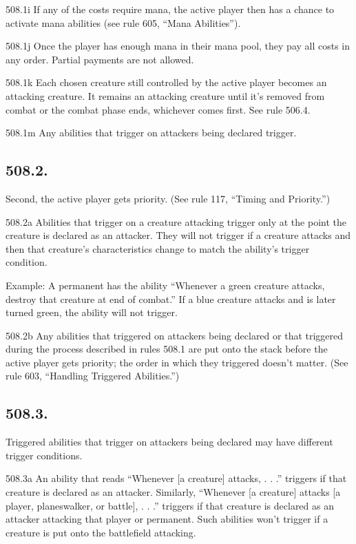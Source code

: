 508.1i If any of the costs require mana, the active player then has a chance to activate mana abilities (see rule 605, “Mana Abilities”).

508.1j Once the player has enough mana in their mana pool, they pay all costs in any order. Partial payments are not allowed.

508.1k Each chosen creature still controlled by the active player becomes an attacking creature. It remains an attacking creature until it’s removed from combat or the combat phase ends, whichever comes first. See rule 506.4.

508.1m Any abilities that trigger on attackers being declared trigger.

\subsection*{508.2.}
Second, the active player gets priority. (See rule 117, “Timing and Priority.”)

508.2a Abilities that trigger on a creature attacking trigger only at the point the creature is declared as an attacker. They will not trigger if a creature attacks and then that creature’s characteristics change to match the ability’s trigger condition.

Example: A permanent has the ability “Whenever a green creature attacks, destroy that creature at end of combat.” If a blue creature attacks and is later turned green, the ability will not trigger.

508.2b Any abilities that triggered on attackers being declared or that triggered during the process described in rules 508.1 are put onto the stack before the active player gets priority; the order in which they triggered doesn’t matter. (See rule 603, “Handling Triggered Abilities.”)

\subsection*{508.3.}
Triggered abilities that trigger on attackers being declared may have different trigger conditions.

508.3a An ability that reads “Whenever [a creature] attacks, . . .” triggers if that creature is declared as an attacker. Similarly, “Whenever [a creature] attacks [a player, planeswalker, or battle], . . .” triggers if that creature is declared as an attacker attacking that player or permanent. Such abilities won’t trigger if a creature is put onto the battlefield attacking.

